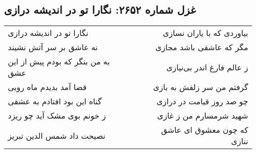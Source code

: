 \begin{center}
\section*{غزل شماره ۲۶۵۲: نگارا تو در اندیشه درازی}
\label{sec:2652}
\begin{longtable}{l p{0.5cm} r}
نگارا تو در اندیشه درازی
&&
بیاوردی که با یاران نسازی
\\
نه عاشق بر سر آتش نشیند
&&
مگر که عاشقی باشد مجازی
\\
به من بنگر که بودم پیش از این عشق
&&
ز عالم فارغ اندر بی‌نیازی
\\
قضا آمد بدیدم ماه رویی
&&
گرفتم من سر زلفش به بازی
\\
گناه این بود افتادم به عشقی
&&
چو صد روز قیامت در درازی
\\
ز خونم بوی مشک آید چو ریزد
&&
شهید شرمسارم من ز غازی
\\
نصیحت داد شمس الدین تبریز
&&
که چون معشوق ای عاشق ننازی
\\
\end{longtable}
\end{center}
